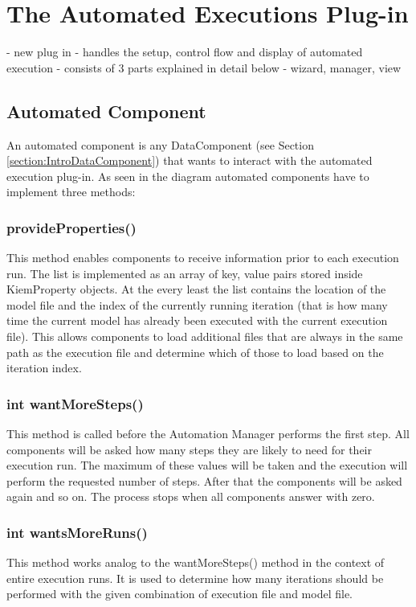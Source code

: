 \chapter{The Automated Executions Plug-in}
- new plug in
- handles the setup, control flow and display of automated execution
- consists of 3 parts explained in detail below
- wizard, manager, view

\section{Automated Component}
An automated component is any DataComponent (see Section \ref{section:IntroDataComponent}) that wants to interact with
the automated execution plug-in. As seen in the diagram automated components
have to implement three methods:

\subsection{provideProperties()}
This method enables components to receive information prior to each execution
run. The list is implemented as an array of key, value pairs stored inside
KiemProperty objects.
At the every least the list contains the location of the model file and the
index of the currently running iteration (that is how many time the current
model has already been executed with the current execution file).
This allows components to load additional files that are always in the
same path as the execution file and determine which of those to load
based on the iteration index.

\subsection{int wantMoreSteps()}
This method is called before the Automation Manager performs the first step.
All components will be asked how many steps they are likely to need for their
execution run. The maximum of these values will be taken and the execution
will perform the requested number of steps. After that the components
will be asked again and so on. The process stops when all components
answer with zero.

\subsection{int wantsMoreRuns()}
This method works analog to the wantMoreSteps() method in the context
of entire execution runs. It is used to determine how many iterations
should be performed with the given combination of execution file and model
file.

